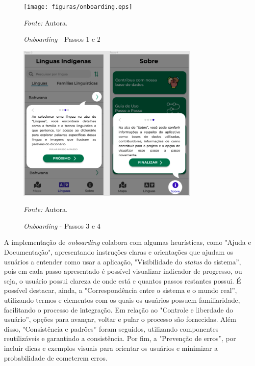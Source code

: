 \begin{figure}[h!]
	\centering
	\caption{\textit{Onboarding} - Passos 1 e 2}
	\begin{adjustbox}{center}
		\texttt{[image: figuras/onboarding.eps]}
	\end{adjustbox}
	\begin{tablenotes}[flushleft]
		\centering
		\item \textit{Fonte:} Autora.
	\end{tablenotes}
	\label{fig22}
\end{figure}

\begin{figure}[h!]
	\centering
	\caption{\textit{Onboarding} - Passos 3 e 4}
	\begin{adjustbox}{center}
		\includegraphics[width=0.8\textwidth]{figuras/onboarding1.eps}
	\end{adjustbox}
	\begin{tablenotes}[flushleft]
		\centering
		\item \textit{Fonte:} Autora.
	\end{tablenotes}
	\label{fig23}
\end{figure}

A implementação de \textit{onboarding} colabora com algumas heurísticas, como "Ajuda e Documentação", apresentando instruções claras e orientações que ajudam os usuários a entender como usar a aplicação, 
"Visibilidade do \textit{status} do sistema'', pois em cada passo apresentado é possível visualizar indicador de progresso, ou seja, o usuário possui clareza de onde está e quantos passos restantes possui. 
É possível destacar, ainda, a "Correspondência entre o sistema e o mundo real'', utilizando termos e elementos com os quais os usuários possuem familiaridade, facilitando o processo de integração. Em 
relação ao "Controle e liberdade do usuário'', opções para avançar, voltar e pular o processo são fornecidas. Além disso, "Consistência e padrões'' foram seguidos, utilizando componentes reutilizáveis e 
garantindo a consistência. Por fim, a "Prevenção de erros'', por incluir dicas e exemplos visuais para orientar os usuários e  minimizar a probabilidade de cometerem erros.

